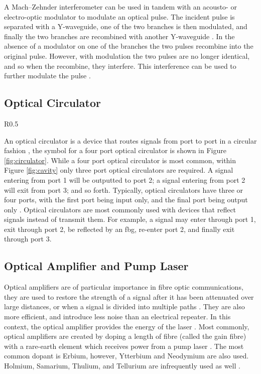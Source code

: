 A Mach--Zehnder interferometer can be used in tandem with an acousto- or electro-optic modulator to modulate an optical pulse. The incident pulse is separated with a Y-waveguide, one of the two branches is then modulated, and finally the two branches are recombined with another Y-waveguide \cite{alazzawi, hausbook, karim}. In the absence of a modulator on one of the branches the two pulses recombine into the original pulse. However, with modulation the two pulses are no longer identical, and so when the recombine, they interfere. This interference can be used to further modulate the pulse \cite{agrawal2002, agrawal2013, hausbook, karim}.

\subsection{Optical Circulator}
\begin{wrapfigure}{R}{0.5\textwidth}
\centering

\caption{Symbol for a four port optical circulator.}
\label{fig:circulator}
\end{wrapfigure}
An optical circulator is a device that routes signals from port to port in a circular fashion \cite{agrawal2002, alazzawi, becker}, the symbol for a four port optical circulator is shown in Figure \ref{fig:circulator}. While a four port optical circulator is most common, within Figure \ref{fig:cavity} only three port optical circulators are required. A signal entering from port 1 will be outputted to port 2; a signal entering from port 2 will exit from port 3; and so forth. Typically, optical circulators have three or four ports, with the first port being input only, and the final port being output only \cite{alazzawi}. Optical circulators are most commonly used with devices that reflect signals instead of transmit them. For example, a signal may enter through port 1, exit through port 2, be reflected by an \gls{fbg}, re-enter port 2, and finally exit through port 3. \\

\subsection{Optical Amplifier and Pump Laser}
Optical amplifiers are of particular importance in fibre optic communications, they are used to restore the strength of a signal after it has been attenuated over large distances, or when a signal is divided into multiple paths \cite{alazzawi, starodoumov}. They are also more efficient, and introduce less noise than an electrical repeater. In this context, the optical amplifier provides the energy of the laser \cite{alazzawi}. Most commonly, optical amplifiers are created by doping a length of fibre (called the gain fibre) with a rare-earth element which receives power from a pump laser \cite{agrawal2002, alazzawi, starodoumov}. The most common dopant is Erbium, however, Ytterbium and Neodymium are also used. Holmium, Samarium, Thulium, and Tellurium are infrequently used as well \cite{agrawal2002}. \\

